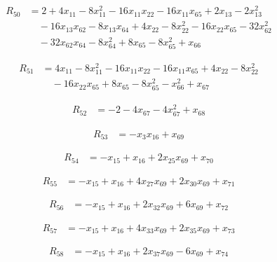 \begin{align*}
R_{50} &= 2 +4 x_{11} -8 x_{11}^{2} -16 x_{11} x_{22} -16 x_{11} x_{65} +2 x_{13} -2 x_{13}^{2} \\
&\quad -16 x_{13} x_{62} -8 x_{13} x_{64} +4 x_{22} -8 x_{22}^{2} -16 x_{22} x_{65} -32 x_{62}^{2} \\
&\quad -32 x_{62} x_{64} -8 x_{64}^{2} +8 x_{65} -8 x_{65}^{2} +x_{66}
\end{align*}

\begin{align*}
R_{51} &= 4 x_{11} -8 x_{11}^{2} -16 x_{11} x_{22} -16 x_{11} x_{65} +4 x_{22} -8 x_{22}^{2} \\
&\quad -16 x_{22} x_{65} +8 x_{65} -8 x_{65}^{2} -x_{66}^{2} +x_{67}
\end{align*}

\begin{align*}
R_{52} &= -2 -4 x_{67} -4 x_{67}^{2} +x_{68}
\end{align*}

\begin{align*}
R_{53} &= -x_{3} x_{16} +x_{69}
\end{align*}

\begin{align*}
R_{54} &= -x_{15} +x_{16} +2 x_{25} x_{69} +x_{70}
\end{align*}

\begin{align*}
R_{55} &= -x_{15} +x_{16} +4 x_{27} x_{69} +2 x_{30} x_{69} +x_{71}
\end{align*}

\begin{align*}
R_{56} &= -x_{15} +x_{16} +2 x_{32} x_{69} +6 x_{69} +x_{72}
\end{align*}

\begin{align*}
R_{57} &= -x_{15} +x_{16} +4 x_{33} x_{69} +2 x_{35} x_{69} +x_{73}
\end{align*}

\begin{align*}
R_{58} &= -x_{15} +x_{16} +2 x_{37} x_{69} -6 x_{69} +x_{74}
\end{align*}

